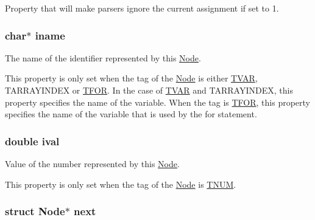 Property that will make parsers ignore the current assignment if set to 1. 

\hypertarget{structNode_a76c70ae7ac3d58ebe41da968fedb8093}{
\subsubsection[{iname}]{\setlength{\rightskip}{0pt plus 5cm}char$\ast$ iname}}\label{structNode_a76c70ae7ac3d58ebe41da968fedb8093}


The name of the identifier represented by this \hyperlink{structNode}{Node}. 

This property is only set when the tag of the \hyperlink{structNode}{Node} is either \hyperlink{node_8h_a83ba1e84fa23f6619c3d29036b160919afe64957b6fe1c660804c3d310000b5f0}{T\-V\-A\-R}, T\-A\-R\-R\-A\-Y\-I\-N\-D\-E\-X or \hyperlink{node_8h_a83ba1e84fa23f6619c3d29036b160919aae1cac6fabc93853164889cdc0d77b1a}{T\-F\-O\-R}. In the case of \hyperlink{node_8h_a83ba1e84fa23f6619c3d29036b160919afe64957b6fe1c660804c3d310000b5f0}{T\-V\-A\-R} and T\-A\-R\-R\-A\-Y\-I\-N\-D\-E\-X, this property specifies the name of the variable. When the tag is \hyperlink{node_8h_a83ba1e84fa23f6619c3d29036b160919aae1cac6fabc93853164889cdc0d77b1a}{T\-F\-O\-R}, this property specifies the name of the variable that is used by the for statement. \hypertarget{structNode_ad7f9455e819b623c0e4a9480476eacfe}{
\subsubsection[{ival}]{\setlength{\rightskip}{0pt plus 5cm}double ival}}\label{structNode_ad7f9455e819b623c0e4a9480476eacfe}


Value of the number represented by this \hyperlink{structNode}{Node}. 

This property is only set when the tag of the \hyperlink{structNode}{Node} is \hyperlink{node_8h_a83ba1e84fa23f6619c3d29036b160919a71fff872f388505135681e9fad482e72}{T\-N\-U\-M}. \hypertarget{structNode_aa162dd1e0693188a22b1f13b9a2a0ef0}{
\subsubsection[{next}]{\setlength{\rightskip}{0pt plus 5cm}struct {\bf Node}$\ast$ next}}\label{structNode_aa162dd1e0693188a22b1f13b9a2a0ef0}


